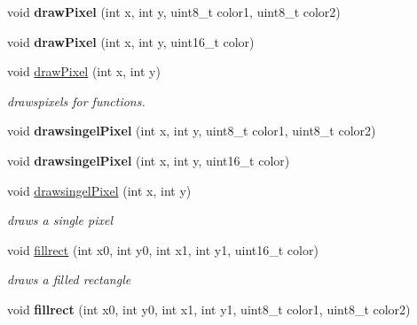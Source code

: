 \textbf{ }\par
\begin{DoxyCompactItemize}
\item 
\mbox{\label{classdisplay_a39b50018876dfbf2beff6d43244456a2}} 
void {\bfseries draw\+Pixel} (int x, int y, uint8\+\_\+t color1, uint8\+\_\+t color2)
\item 
\mbox{\label{classdisplay_a9ed4ea04ea86be2c4e0ad21b2c8da0e1}} 
void {\bfseries draw\+Pixel} (int x, int y, uint16\+\_\+t color)
\item 
void \hyperlink{classdisplay_aafdae0e6f1d077e74c362ce0bd3124c9}{draw\+Pixel} (int x, int y)
\begin{DoxyCompactList}\small\item\em drawspixels for functions. \end{DoxyCompactList}\end{DoxyCompactItemize}

\textbf{ }\par
\begin{DoxyCompactItemize}
\item 
\mbox{\label{classdisplay_a45b31b92e29b323031e21a0134614e70}} 
void {\bfseries drawsingel\+Pixel} (int x, int y, uint8\+\_\+t color1, uint8\+\_\+t color2)
\item 
\mbox{\label{classdisplay_a7922a61962bdf9b768119ee87cead4db}} 
void {\bfseries drawsingel\+Pixel} (int x, int y, uint16\+\_\+t color)
\item 
void \hyperlink{classdisplay_a33c1025dac3f51844cbb2c2cc191ad16}{drawsingel\+Pixel} (int x, int y)
\begin{DoxyCompactList}\small\item\em draws a single pixel \end{DoxyCompactList}\end{DoxyCompactItemize}

\textbf{ }\par
\begin{DoxyCompactItemize}
\item 
void \hyperlink{classdisplay_ae33f12ec551d199f3422a581fa40385c}{fillrect} (int x0, int y0, int x1, int y1, uint16\+\_\+t color)
\begin{DoxyCompactList}\small\item\em draws a filled rectangle \end{DoxyCompactList}\item 
\mbox{\label{classdisplay_a85b1866b6bfc88a8f057052a5e8c09b9}} 
void {\bfseries fillrect} (int x0, int y0, int x1, int y1, uint8\+\_\+t color1, uint8\+\_\+t color2)
\end{DoxyCompactItemize}

